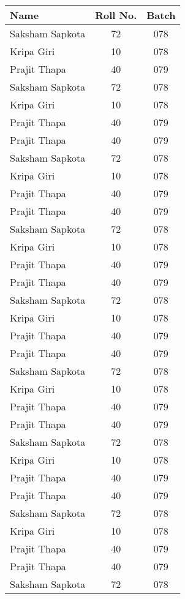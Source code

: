 \documentclass{article}
\begin{document}
	\listoftables
		\begin{longtable}{|l|c|c|}
		\hline
		Name & Roll No. & Batch\\
		\endfirsthead
		\hline
		
		Saksham Sapkota & 72 & 078 \\\hline
		\endhead
		Kripa Giri & 10 & 078 \\\hline
		Prajit Thapa & 40 & 079 \\\hline
		Saksham Sapkota & 72 & 078 \\\hline
		Kripa Giri & 10 & 078 \\\hline
		Prajit Thapa & 40 & 079 \\\hline
		Prajit Thapa & 40 & 079 \\\hline
		Saksham Sapkota & 72 & 078 \\\hline
		Kripa Giri & 10 & 078 \\\hline
		Prajit Thapa & 40 & 079 \\\hline
		Prajit Thapa & 40 & 079 \\\hline
		Saksham Sapkota & 72 & 078 \\\hline
		Kripa Giri & 10 & 078 \\\hline
		Prajit Thapa & 40 & 079 \\\hline
		Prajit Thapa & 40 & 079 \\\hline
		Saksham Sapkota & 72 & 078 \\\hline
		Kripa Giri & 10 & 078 \\\hline
		Prajit Thapa & 40 & 079 \\\hline
		Prajit Thapa & 40 & 079 \\\hline
		Saksham Sapkota & 72 & 078 \\\hline
		Kripa Giri & 10 & 078 \\\hline
		Prajit Thapa & 40 & 079 \\\hline
		Prajit Thapa & 40 & 079 \\\hline
		Saksham Sapkota & 72 & 078 \\\hline
		Kripa Giri & 10 & 078 \\\hline
		Prajit Thapa & 40 & 079 \\\hline
		Prajit Thapa & 40 & 079 \\\hline
		Saksham Sapkota & 72 & 078 \\\hline
		Kripa Giri & 10 & 078 \\\hline
		Prajit Thapa & 40 & 079 \\\hline
		Prajit Thapa & 40 & 079 \\\hline
		Saksham Sapkota & 72 & 078 \\\hline

\end{longtable}
\end{document}

